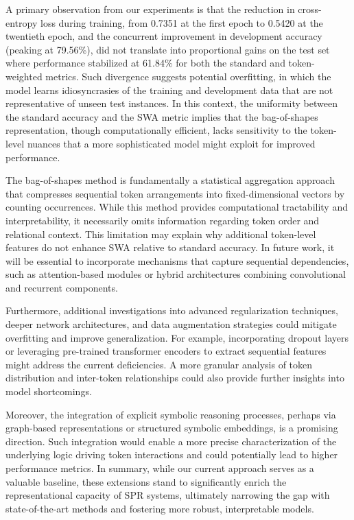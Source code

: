 \documentclass{article}
\begin{document}
A primary observation from our experiments is that the reduction in cross-entropy loss during training, from 0.7351 at the first epoch to 0.5420 at the twentieth epoch, and the concurrent improvement in development accuracy (peaking at 79.56\%), did not translate into proportional gains on the test set where performance stabilized at 61.84\% for both the standard and token-weighted metrics. Such divergence suggests potential overfitting, in which the model learns idiosyncrasies of the training and development data that are not representative of unseen test instances. In this context, the uniformity between the standard accuracy and the SWA metric implies that the bag-of-shapes representation, though computationally efficient, lacks sensitivity to the token-level nuances that a more sophisticated model might exploit for improved performance.

The bag-of-shapes method is fundamentally a statistical aggregation approach that compresses sequential token arrangements into fixed-dimensional vectors by counting occurrences. While this method provides computational tractability and interpretability, it necessarily omits information regarding token order and relational context. This limitation may explain why additional token-level features do not enhance SWA relative to standard accuracy. In future work, it will be essential to incorporate mechanisms that capture sequential dependencies, such as attention-based modules or hybrid architectures combining convolutional and recurrent components.

Furthermore, additional investigations into advanced regularization techniques, deeper network architectures, and data augmentation strategies could mitigate overfitting and improve generalization. For example, incorporating dropout layers or leveraging pre-trained transformer encoders to extract sequential features might address the current deficiencies. A more granular analysis of token distribution and inter-token relationships could also provide further insights into model shortcomings.

Moreover, the integration of explicit symbolic reasoning processes, perhaps via graph-based representations or structured symbolic embeddings, is a promising direction. Such integration would enable a more precise characterization of the underlying logic driving token interactions and could potentially lead to higher performance metrics. In summary, while our current approach serves as a valuable baseline, these extensions stand to significantly enrich the representational capacity of SPR systems, ultimately narrowing the gap with state-of-the-art methods and fostering more robust, interpretable models.
\end{document}

